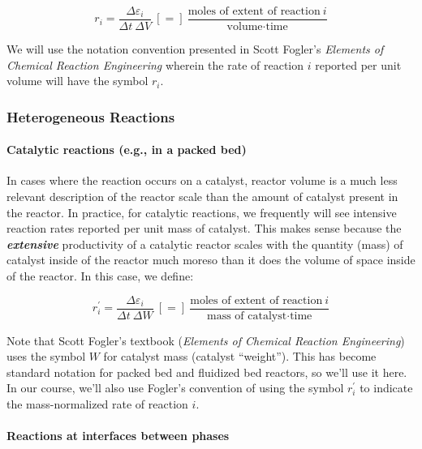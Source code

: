 \documentclass[11pt]{article}
\begin{document}
\[r_i = \frac{\Delta \varepsilon_i}{\Delta t \ \Delta V} \ [=] \ \frac{\text{moles of extent of reaction} \ i}{\text{volume} \cdot \text{time}}\]

We will use the notation convention presented in Scott Fogler's
\emph{Elements of Chemical Reaction Engineering} wherein the rate of
reaction \(i\) reported per unit volume will have the symbol \(r_i\).

\hypertarget{heterogeneous-reactions}{%
\subsubsection{Heterogeneous Reactions}\label{heterogeneous-reactions}}

\hypertarget{catalytic-reactions-e.g.-in-a-packed-bed}{%
\paragraph{Catalytic reactions (e.g., in a packed
bed)}\label{catalytic-reactions-e.g.-in-a-packed-bed}}

In cases where the reaction occurs on a catalyst, reactor volume is a
much less relevant description of the reactor scale than the amount of
catalyst present in the reactor. In practice, for catalytic reactions,
we frequently will see intensive reaction rates reported per unit mass
of catalyst. This makes sense because the \textbf{\emph{extensive}}
productivity of a catalytic reactor scales with the quantity (mass) of
catalyst inside of the reactor much moreso than it does the volume of
space inside of the reactor. In this case, we define:

\[r_i^\prime = \frac{\Delta \varepsilon_i}{\Delta t \ \Delta W} \ [=] \ \frac{\text{moles of extent of reaction} \ i}{\text{mass of catalyst} \cdot \text{time}}\]

Note that Scott Fogler's textbook (\emph{Elements of Chemical Reaction
Engineering}) uses the symbol \(W\) for catalyst mass (catalyst
``weight''). This has become standard notation for packed bed and
fluidized bed reactors, so we'll use it here. In our course, we'll also
use Fogler's convention of using the symbol \(r_i^\prime\) to indicate
the mass-normalized rate of reaction \(i\).

\hypertarget{reactions-at-interfaces-between-phases}{%
\paragraph{Reactions at interfaces between
phases}\label{reactions-at-interfaces-between-phases}}
\end{document}

